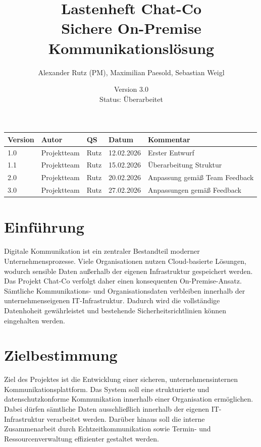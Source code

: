 \documentclass[12pt,a4paper]{extarticle}
\title{
    \textbf{Lastenheft Chat-Co} \\
    \large Sichere On-Premise Kommunikationslösung
}
\author{Alexander Rutz (PM), Maximilian Paesold, Sebastian Weigl}
\date{Version 3.0 \\ Status: Überarbeitet}
\begin{document}
\maketitle

\begin{center}
  \begin{tabular}{|l|l|l|l|l|}
    \hline
    Version & Autor & QS & Datum & Kommentar \\
    \hline
    1.0 & Projektteam & Rutz & 12.02.2026 & Erster Entwurf \\
    \hline
    1.1 & Projektteam & Rutz & 15.02.2026 & Überarbeitung Struktur \\
    \hline
    2.0 & Projektteam & Rutz & 20.02.2026 & Anpassung gemäß Team Feedback \\
    \hline
    3.0 & Projektteam & Rutz & 27.02.2026 & Anpassungen gemäß Feedback\\
    \hline
\end{tabular}
\end{center}

\newpage
\tableofcontents
\newpage


\section{Einführung}

Digitale Kommunikation ist ein zentraler Bestandteil moderner Unternehmensprozesse. Viele Organisationen nutzen Cloud-basierte Lösungen, wodurch sensible Daten außerhalb der eigenen Infrastruktur gespeichert werden.
Das Projekt Chat-Co verfolgt daher einen konsequenten On-Premise-Ansatz. Sämtliche Kommunikations- und Organisationsdaten verbleiben innerhalb der unternehmenseigenen IT-Infrastruktur. Dadurch wird die vollständige Datenhoheit gewährleistet und bestehende Sicherheitsrichtlinien können eingehalten werden.

\vspace{1cm}
\section{Zielbestimmung}

Ziel des Projektes ist die Entwicklung einer sicheren, unternehmensinternen Kommunikationsplattform.
Das System soll eine strukturierte und datenschutzkonforme Kommunikation innerhalb einer Organisation ermöglichen. Dabei dürfen sämtliche Daten ausschließlich innerhalb der eigenen IT-Infrastruktur verarbeitet werden.
Darüber hinaus soll die interne Zusammenarbeit durch Echtzeitkommunikation sowie Termin- und Ressourcenverwaltung effizienter gestaltet werden.
\end{document}
